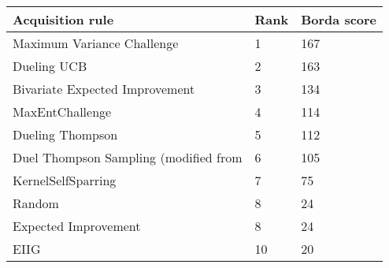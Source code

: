 \begin{tabular}{lll}
Acquisition rule & Rank & Borda score \\ 
\hline 
Maximum Variance Challenge                                 & 1 & 167 \\ 
Dueling UCB \citep{Benavoli2020}                           & 2 & 163 \\ 
Bivariate Expected Improvement \citep{Nielsen2015}         & 3 & 134 \\ 
MaxEntChallenge                                            & 4 & 114 \\ 
Dueling Thompson \citep{Benavoli2020}                      & 5 & 112 \\ 
Duel Thompson Sampling (modified from \citet{Gonzalez2017} & 6 & 105 \\ 
KernelSelfSparring \citep{Sui2017}                         & 7 & 75 \\ 
Random                                                     & 8 & 24 \\ 
Expected Improvement \citep{Brochu2010a}                   & 8 & 24 \\ 
EIIG \citep{Benavoli2020}                                  & 10 & 20 \\ 
\hline 
\end{tabular}